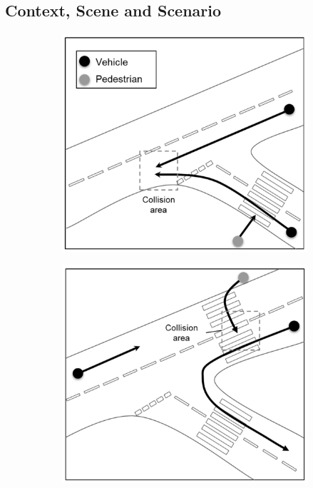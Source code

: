 \subsection{Context, Scene and Scenario}\label{TestsDescriptionAndTechnicalities}
\begin{figure}[!t]
    \centering
    \begin{subfigure}{.24\textwidth}
        \includegraphics[width=1\textwidth]{../other/figures/det_fig3a}
        \caption{}
        \label{Test_a}
    \end{subfigure}
    \begin{subfigure}{.24\textwidth}
        \includegraphics[width=1\textwidth]{../other/figures/det_fig3b}

\end{subfigure}
\end{figure}
